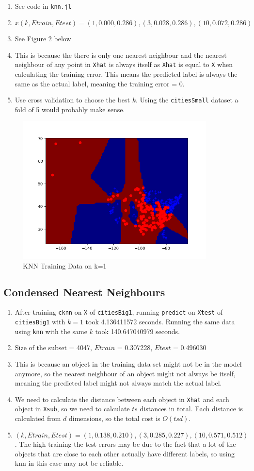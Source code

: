 \documentclass{article}
\def\enum#1{\begin{enumerate}#1\end{enumerate}}
\begin{document}
\enum{
	\item See code in \texttt{knn.jl}
	\item $x(k, Etrain, Etest) = (1, 0.000, 0.286), (3, 0.028, 0.286), (10, 0.072, 0.286)$
	\item See Figure 2 below
	\item This is because the there is only one nearest neighbour and the nearest neighbour of any point in \texttt{Xhat} is always itself as \texttt{Xhat} is equal to \texttt{X} when calculating the training error. This means the predicted label is always the same as the actual label, meaning the training error = 0.
	\item Use cross validation to choose the best $k$. Using the \texttt{citiesSmall} dataset a fold of 5 would probably make sense.
} 
\begin{figure}[h!]
  \includegraphics[height=7.5cm]{knn_train_data_k=1.png}
  \caption{KNN Training Data on k=1}
  \label{fig: knn}
\end{figure}

\subsection{Condensed Nearest Neighbours}

\enum{
	\item After training \texttt{cknn} on \texttt{X} of \texttt{citiesBig1}, running \texttt{predict} on \texttt{Xtest} of \texttt{citiesBig1} with $k = 1$ took 4.136411572 seconds. Running the same data using \texttt{knn} with the same $k$ took 140.647040979 seconds.
	\item Size of the subset = 4047, $Etrain$ = 0.307228, $Etest$ = 0.496030
	\item This is because an object in the training data set might not be in the model anymore, so the nearest neighbour of an object might not always be itself, meaning the predicted label might not always match the actual label.
	\item We need to calculate the distance between each object in \texttt{Xhat} and each object in \texttt{Xsub}, so we need to calculate $ts$ distances in total. Each distance is calculated from $d$ dimensions, so the total cost is $O(tsd)$.
	\item $(k, Etrain, Etest) = (1, 0.138, 0.210), (3, 0.285, 0.227), (10, 0.571, 0.512)$. The high training the test errors may be due to the fact that a lot of the objects that are close to each other actually have different labels, so using knn in this case may not be reliable.
}
\end{document}

